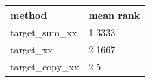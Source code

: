 \begin{tabular}{ll}
\toprule
method & mean rank \\
\midrule
target\_sum\_xx & 1.3333 \\
target\_xx & 2.1667 \\
target\_copy\_xx & 2.5 \\
\bottomrule
\end{tabular}

